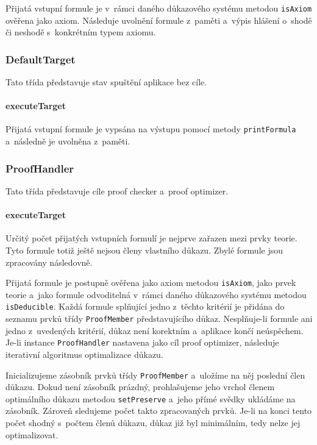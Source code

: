 \documentclass[thesis=B,czech,hidelinks]{thesis}[2012/06/26]
\begin{document}
Přijatá vstupní formule je v~rámci daného důkazového systému metodou \texttt{isAxiom} ověřena jako axiom. Následuje uvolnění formule z~paměti a~výpis hlášení o~shodě či neshodě s~konkrétním typem axiomu.

\subsubsection{DefaultTarget}

Tato třída představuje stav spuštění aplikace bez cíle.

\paragraph{executeTarget}

Přijatá vstupní formule je vypsána na výstupu pomocí metody \texttt{printFormula} a~následně je uvolněna z~paměti.

\subsubsection{ProofHandler}

Tato třída představuje cíle proof checker a~proof optimizer.

\paragraph{executeTarget}

Určitý počet přijatých vstupních formulí je nejprve zařazen mezi prvky teorie. Tyto formule totiž ještě nejsou členy vlastního důkazu. Zbylé formule jsou zpracovány následovně.

Přijatá formule je postupně ověřena jako axiom metodou \texttt{isAxiom}, jako prvek teorie a~jako formule odvoditelná v~rámci daného důkazového systému metodou \texttt{isDeducible}. Každá formule splňující jedno z~těchto kritérií je přidána do seznamu prvků třídy \texttt{ProofMember} představujícího důkaz. Nesplňuje-li formule ani jedno z~uvedených kritérií, důkaz není korektním a~aplikace končí neúspěchem. Je-li instance \texttt{ProofHandler} nastavena jako cíl proof optimizer, následuje iterativní algoritmus optimalizace důkazu.

Inicializujeme zásobník prvků třídy \texttt{ProofMember} a~uložíme na něj poslední člen důkazu. Dokud není zásobník prázdný, prohlašujeme jeho vrchol členem optimálního důkazu metodou \texttt{setPreserve} a~jeho přímé svědky ukládáme na zásobník. Zároveň sledujeme počet takto zpracovaných prvků. Je-li na konci tento počet shodný s~počtem členů důkazu, důkaz již byl minimálním, tedy nelze jej optimalizovat.
\end{document}
